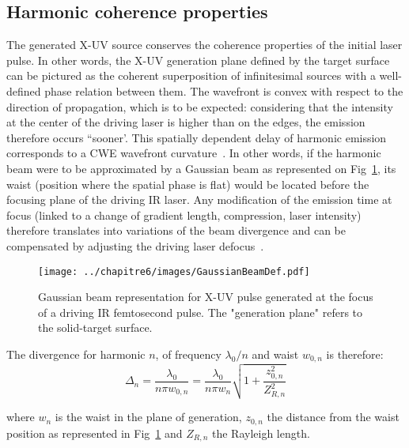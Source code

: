 \subsection{Harmonic coherence properties}\label{subsection:Harmonic spatial properties}

The generated X-UV source conserves the coherence properties of the initial laser pulse. In other words, the X-UV generation plane defined by the target surface can be pictured as the coherent superposition of infinitesimal sources with a well-defined phase relation between them. The wavefront is convex with respect to the direction of propagation, which is to be expected: considering that the intensity at the center of the driving laser is higher than on the edges, the emission therefore occurs ``sooner'. This spatially dependent delay of harmonic emission corresponds to a CWE wavefront curvature~\cite{TheseArnaud}. In other words, if the harmonic beam were to be approximated by a Gaussian beam as represented on Fig~\ref{fig:GaussianBeamDef0}, its waist (position where the spatial phase is flat) would be located before the focusing plane of the driving IR laser. Any modification of the emission time at focus (linked to a change of gradient length, compression, laser intensity) therefore translates into variations of the beam divergence and can be compensated by adjusting the driving laser defocus~\cite{TheseArnaud,TheseCedric}.


\begin{figure}[H]
\centering
\texttt{[image: ../chapitre6/images/GaussianBeamDef.pdf]}\\
\caption{\label{fig:GaussianBeamDef0} Gaussian beam representation for X-UV pulse generated at the focus of a driving IR femtosecond pulse. The "generation plane" refers to the solid-target surface.}
\end{figure} 

\noindent The divergence for harmonic $n$, of frequency $\lambda_0/n$ and waist $w_{0,n}$ is therefore:
\begin{equation}
\label{eq:HHGdivDef}
\Delta_{n} = \frac{\lambda_0}{n\pi w_{0,n}} = \frac{\lambda_0}{n\pi w_{n}}\sqrt{1+\frac{z_{0,n}^2}{Z_{R,n}^2}} 
\end{equation}

\noindent where $w_n$ is the waist in the plane of generation, $z_{0,n}$ the distance from the waist position as represented in Fig~\ref{fig:GaussianBeamDef0} and $Z_{R,n}$ the Rayleigh length. \\

